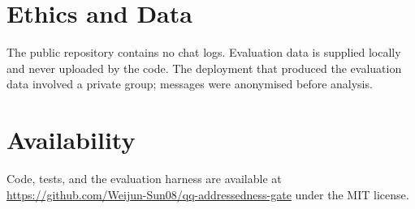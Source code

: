 ﻿\documentclass[11pt]{article}
\begin{document}
\section{Ethics and Data}
The public repository contains no chat logs.
Evaluation data is supplied locally and never uploaded by the code.
The deployment that produced the evaluation data involved a private group; messages were anonymised before analysis.

\section{Availability}
Code, tests, and the evaluation harness are available at
\url{https://github.com/Weijun-Sun08/qq-addressedness-gate} under the MIT license.



\end{document}
